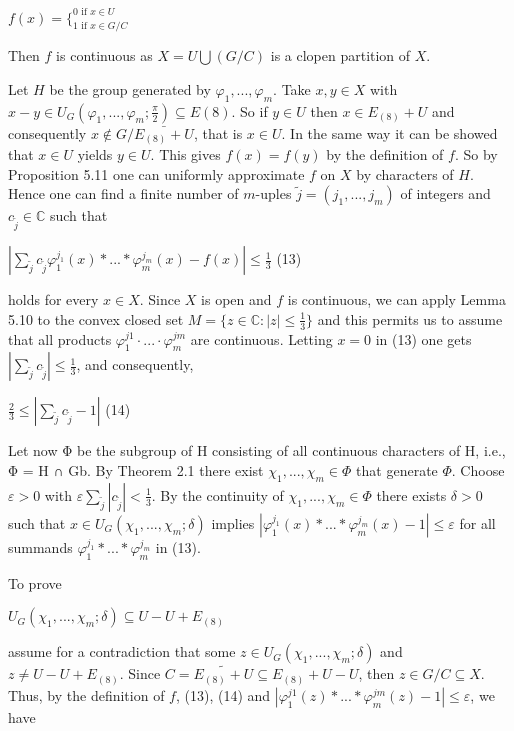 \documentclass[12pt]{article}
\begin{document}
    $f(x)=\{^{0 \text{ if } x \in U}_{1 \text{ if } x \in G / C}$


Then $f$ is continuous as $X = U \bigcup (G / C)$ is a clopen partition of $X$.


    Let $H$ be the group generated by $\varphi_1, . . . , \varphi_m$. Take $x, y \in X$ with $x - y \in U_G(\varphi_1, . . . , \varphi_m; \frac{\pi}{2}) \subseteq E(8)$. So if
$y \in U$ then $x \in E_{(8)} + U$ and consequently $x \notin G / \bar{E_{(8)} + U}$, that is $x \in U$. In the same way it can be showed
that $x \in U$ yields $y \in U$. This gives $f(x) = f(y)$ by the definition of $f$. So by Proposition 5.11 one can uniformly
approximate $f$ on $X$ by characters of $H$. Hence one can find a finite number of $m$-uples $\tilde{j} = (j_1, . . . , j_m)$ of
integers and $c_{\tilde{j}} \in \mathbb{C}$ such that


    $|\sum_{\tilde{j}} c_{\tilde{j}} \varphi^{j_1}_1(x) * ... * \varphi^{j_m}_m (x) - f(x)| \leq \frac{1}{3}$ (13)


    holds for every $x \in X$. Since $X$ is open and $f$ is continuous, we can apply Lemma 5.10 to the convex closed set
$M = \{z \in \mathbb{C} : |z| \leq \frac{1}{3}\}$ and this permits us to assume that all products $\varphi^{j1}_1· . . . · \varphi^{jm}_m$ are continuous. Letting
$x = 0$ in (13) one gets $|\sum_{\tilde{j}}c_{\tilde{j}}| \leq \frac{1}{3}$, and consequently,


    $\frac{2}{3} \leq |\sum_\tilde{j} c_\tilde{j} - 1|$  (14)


    Let now Φ be the subgroup of H consisting of all continuous characters of H, i.e., Φ = H ∩ Gb. By Theorem
2.1 there exist $\chi_1, . . . , \chi_m \in \Phi$ that generate $\Phi$. Choose $\varepsilon > 0$ with $\varepsilon\sum_\tilde{j}|c_\tilde{j}| < \frac{1}{3}$. By the continuity of
$\chi_1, . . . , \chi_m \in \Phi$ there exists $\delta > 0$ such that $x \in U_G(\chi_1, . . . , \chi_m; \delta)$ implies $|\varphi^{j_1}_1(x) * ... * \varphi^{j_m}_m(x) - 1| \leq \varepsilon$ for all
summands $\varphi^{j_1}_1 * ... * \varphi^{j_m}_m$ in (13).


    To prove


    $U_G (\chi_1, ..., \chi_m; \delta) \subseteq U - U + E_{(8)}$


    assume for a contradiction that some $z \in U_G(\chi_1, . . . , \chi_m; \delta)$ and $z \neq U - U + E_{(8)}$. Since $C = \tilde{E_{(8)} + U} \subseteq E_{(8)} + U - U$,
then $z \in G / C \subseteq X$. Thus, by the definition of $f$, (13), (14) and $|\varphi^{j1}_1(z) * . . . * \varphi^{jm}_m (z) - 1| \leq \varepsilon$,
we have
\end{document}
